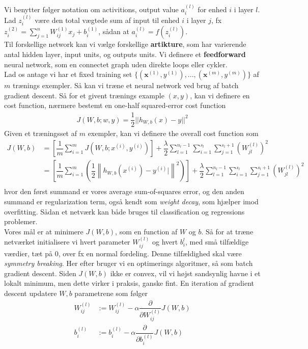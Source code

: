\documentclass[paper=a4, fontsize=11pt]{scrartcl} %
\numberwithin{equation}{section} %
\numberwithin{figure}{section} %
\numberwithin{table}{section} %
\begin{document}
	Vi benytter følger notation om activitions, output value $a^{(l)}_i$ for enhed $i$ i layer $l$. Lad $z_i^{(l)}$ være den total vægtede sum af input til enhed $i$ i layer $j$, fx $z^{(2)}_i=\sum_{j=1}^{n}W_{ij}^{(1)}x_j+b_i^{(1)}$, sådan at $a^{(l)}_i=f(z_i^{(l)})$. \\
	
	Til forskellige network kan vi vælge forskellige \textbf{artikture}, som har varierende antal hidden layer, input units, og outputs units. Vi definere et \textbf{feedforward} neural network, som en connectet graph uden direkte loops eller cykler. \\
	
	Lad os antage vi har et fixed training set $\{(\mathbf{x}^{(1)},y^{(1)}),...,(\mathbf{x}^{(m)},y^{(m)})\}$ af $m$ trænings exempler. Så kan vi træne et neural network ved brug af batch gradient descent. Så for et givent trænings example $(x,y)$, kan vi definere en cost function, nærmere bestemt en one-half squared-error cost function
	\begin{align*}
	J(W,b;w,y)=\dfrac{1}{2}||h_{W,b}(x)-y||^2
	\end{align*}
	Given et træningsset af $m$ exempler, kan vi definere the overall cost function som
	\begin{align*}
	J(W,b)&=\left[\dfrac{1}{m}\sum_{i=1}^{m}J(W,b;x^{(i)},y^{(i)})\right]+\dfrac{\lambda}{2}\sum_{l=1}^{n_l-1}\sum_{i=1}^{s_l}\sum_{j=1}^{s_l+1}\left(W_{jl}^{(l)}\right)^2 \\
	&=\left[\dfrac{1}{m}\sum_{i=1}^{m}\left(\dfrac{1}{2}\left\|h_{W,b}(x^{(i)})-y^{(i)}|\right\|^2\right)\right]+\dfrac{\lambda}{2}\sum_{l=1}^{n_l-1}\sum_{i=1}^{s_l}\sum_{j=1}^{s_l+1}\left(W_{jl}^{(l)}\right)^2 \\
	\end{align*}
	hvor den først summand er vores average sum-of-squares error, og den anden summand er regularization term, også kendt som \textit{weight decay}, som hjælper imod overfitting. Sådan et netværk kan både bruges til classification og regressions problemer. \\
	
	Vores mål er at minimere $J(W,b)$, som en function af $W$ og $b$. Så for at træne netværket initialisere vi hvert parameter $W_{ij}^{(l)}$ og hvert $b_i^{l}$, med små tilfældige værdier, tæt på $0$, over fx en normal fordeling. Denne tilfældighed skal være \textit{symmetry breaking}. Her efter bruger vi en optimerings algoritmer, så som batch gradient descent. Siden  $J(W,b)$ ikke er convex, vil vi højst sandsynlig havne i et lokalt minimum, men dette virker i praksis, ganske fint. En iteration af gradient descent updatere $W,b$ parametrene som følger
	\begin{align*}
	W^{(l)}_{ij}&:=W^{(l)}_{ij}-\alpha\dfrac{\partial}{\partial W^{(l)}_{ij}}J(W,b) \\
	b^{(l)}_i &:= b_i^{(l)}-\alpha\dfrac{\partial}{\partial b_i^{(l)}}J(W,b)
	\end{align*}
	
\end{document}
